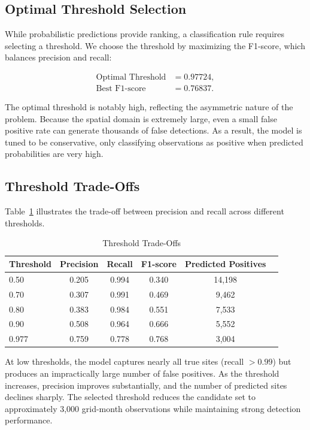 \documentclass[12pt]{article}
\begin{document}
\subsection{Optimal Threshold Selection}

While probabilistic predictions provide ranking, a classification rule requires selecting a threshold. We choose the threshold by maximizing the F1-score, which balances precision and recall:

\begin{align*}
\text{Optimal Threshold} &= 0.97724, \\
\text{Best F1-score}     &= 0.76837.
\end{align*}

The optimal threshold is notably high, reflecting the asymmetric nature of the problem. Because the spatial domain is extremely large, even a small false positive rate can generate thousands of false detections. As a result, the model is tuned to be conservative, only classifying observations as positive when predicted probabilities are very high.

\subsection{Threshold Trade-Offs}

Table~\ref{tab:threshold_ext} illustrates the trade-off between precision and recall across different thresholds.

\begin{table}[H]
\centering
\caption{Threshold Trade-Offs}
\label{tab:threshold_ext}
\begin{tabular}{lccccc}
\toprule
Threshold & Precision & Recall & F1-score & Predicted Positives \\
\midrule
0.50 & 0.205 & 0.994 & 0.340 & 14{,}198 \\
0.70 & 0.307 & 0.991 & 0.469 & 9{,}462 \\
0.80 & 0.383 & 0.984 & 0.551 & 7{,}533 \\
0.90 & 0.508 & 0.964 & 0.666 & 5{,}552 \\
0.977 & 0.759 & 0.778 & 0.768 & 3{,}004 \\
\bottomrule
\end{tabular}
\end{table}

At low thresholds, the model captures nearly all true sites (recall $> 0.99$) but produces an impractically large number of false positives. As the threshold increases, precision improves substantially, and the number of predicted sites declines sharply. The selected threshold reduces the candidate set to approximately 3,000 grid-month observations while maintaining strong detection performance.
\end{document}

